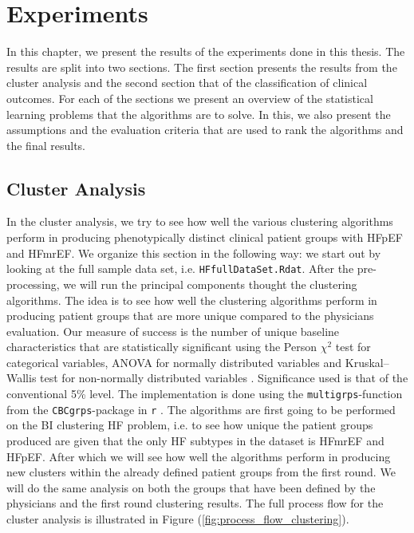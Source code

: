 \documentclass[../thesis.tex]{subfiles}
\begin{document}
\chapter{Experiments}
\label{chap:exp}

\noindent In this chapter, we present the results of the experiments done in this thesis. The results are split into two sections. The first section presents the results from the cluster analysis and the second section that of the classification of clinical outcomes. For each of the sections we present an overview of the statistical learning problems that the algorithms are to solve. In this, we also present the assumptions and the evaluation criteria that are used to rank the algorithms and the final results. 

\section{Cluster Analysis}

\noindent In the cluster analysis, we try to see how well the various clustering algorithms perform in producing phenotypically distinct clinical patient groups with HFpEF and HFmrEF. We organize this section in the following way: we start out by looking at the full sample data set, i.e. \texttt{HFfullDataSet.Rdat}. After the pre-processing, we will run the principal components thought the clustering algorithms. The idea is to see how well the clustering algorithms perform in producing patient groups that are more unique compared to the physicians evaluation. Our measure of success is the number of unique baseline characteristics that are statistically significant using the Person $\chi^2$ test for categorical variables, ANOVA for normally distributed variables and Kruskal–Wallis test for non-normally distributed variables \citep{kruskal1952use}. Significance used is that of the conventional 5\% level. The implementation is done using the \texttt{multigrps}-function from the \texttt{CBCgrps}-package in \texttt{r} \citep{CBCgrps}. The algorithms are first going to be performed on the BI clustering HF problem, i.e. to see how unique the patient groups produced are given that the only HF subtypes in the dataset is HFmrEF and HFpEF. After which we will see how well the algorithms perform in producing new clusters within the already defined patient groups from the first round. We will do the same analysis on both the groups that have been defined by the physicians and the first round clustering results. The full process flow for the cluster analysis is illustrated in Figure (\ref{fig:process_flow_clustering}).
\end{document}
